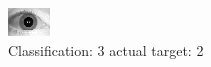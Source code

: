 \begin{figure}[h!]
\begin{center}
\includegraphics[width=0.60\columnwidth]{figures/ID1781_class_3_target_2.png}
\end{center}
\caption{ Classification: 3 actual target: 2}
\label{fig:ID1781_class_3_target_2}
\end{figure}
